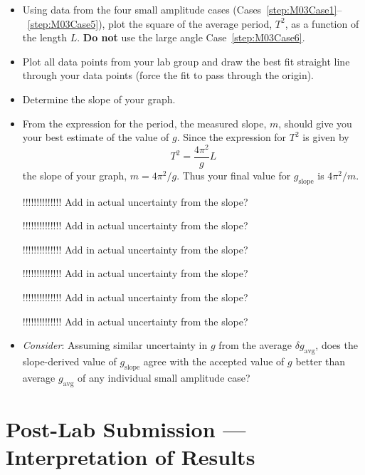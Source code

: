 \begin{enumerate}
\begin{itemize}
\item Using data from the four small amplitude cases (Cases~\ref{step:M03Case1}--~\ref{step:M03Case5}), plot the square of the average period, $T^2$, as a function of the length $L$. \textbf{Do not} use the large angle Case~\ref{step:M03Case6}.
\item Plot all data points from your lab group and draw the best fit straight line through your data points (force the fit to pass through the origin).
\item Determine the slope of your graph.
\item From the expression for the period, the measured slope, $m$, should give you your best estimate of the value of $g$.  Since the expression for $T^2$ is given by
  \begin{equation}
    \label{eq:M03slope}
    T^2 = \frac{4\pi^2}{g} L
  \end{equation}
  the slope of your graph, $m = 4\pi^2/g$.  Thus your final value for $g_\text{slope}$ is $4\pi^2/m$.
  
!!!!!!!!!!!!!! Add in actual uncertainty from the slope?

  !!!!!!!!!!!!!! Add in actual uncertainty from the slope?


!!!!!!!!!!!!!! Add in actual uncertainty from the slope?


!!!!!!!!!!!!!! Add in actual uncertainty from the slope?


!!!!!!!!!!!!!! Add in actual uncertainty from the slope?


!!!!!!!!!!!!!! Add in actual uncertainty from the slope?

  \item \textit{Consider}: Assuming similar uncertainty in $g$ from the average $\delta g_{\text{avg}}$, does the slope-derived value of $g_\text{slope}$ agree with the accepted value of $g$ better than average $g_{\text{avg}}$ of any individual small amplitude case?
\end{itemize}

\end{enumerate}










\section{Post-Lab Submission --- Interpretation of Results}

